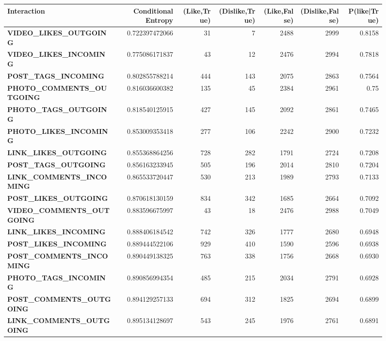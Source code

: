 \documentclass[letterpaper]{article}
\begin{document}
\begin{figure}
\begin{table}
	\centering
	\begin{tabular}{| >{\small}l | >{\small}r | >{\small}r | >{\small}r | >{\small}r | >{\small}r | >{\small}r |}
	\hline
	Interaction & Conditional Entropy & (Like,True) & (Dislike,True) & (Like,False) & (Dislike,False)  & P(like|True)\\
	\hline
	\textbf{VIDEO\_LIKES\_OUTGOING} & 0.722397472066 & 31 & 7 & 2488 & 2999 & 0.8158\\
	\hline
	\textbf{VIDEO\_LIKES\_INCOMING} & 0.775086171837 & 43 & 12 & 2476 & 2994 & 0.7818\\
	\hline
	\textbf{POST\_TAGS\_INCOMING} & 0.802855788214 & 444 & 143 & 2075 & 2863 & 0.7564\\
	\hline
	\textbf{PHOTO\_COMMENTS\_OUTGOING} & 0.816036600382 & 135 & 45 & 2384 & 2961 & 0.75\\
	\hline
	\textbf{PHOTO\_TAGS\_OUTGOING} & 0.818540125915 & 427 & 145 & 2092 & 2861 & 0.7465\\
	\hline
	\textbf{PHOTO\_LIKES\_INCOMING} & 0.853009353418 & 277 & 106 & 2242 & 2900 & 0.7232\\
	\hline
	\textbf{LINK\_LIKES\_OUTGOING} & 0.855368864256 & 728 & 282 & 1791 & 2724 & 0.7208\\
	\hline
	\textbf{POST\_TAGS\_OUTGOING} & 0.856163233945 & 505 & 196 & 2014 & 2810 & 0.7204\\
	\hline
	\textbf{LINK\_COMMENTS\_INCOMING} & 0.865533720447 & 530 & 213 & 1989 & 2793 & 0.7133 \\
	\hline
	\textbf{POST\_LIKES\_OUTGOING} & 0.870618130159 & 834 & 342 & 1685 & 2664 & 0.7092\\
	\hline
	\textbf{VIDEO\_COMMENTS\_OUTGOING} & 0.883596675997 & 43 & 18 & 2476 & 2988 & 0.7049\\
	\hline
	\textbf{LINK\_LIKES\_INCOMING} & 0.888406184542 & 742 & 326 & 1777 & 2680 & 0.6948\\
	\hline
	\textbf{POST\_LIKES\_INCOMING} & 0.889444522106 & 929 & 410 & 1590 & 2596 & 0.6938\\
	\hline
	\textbf{POST\_COMMENTS\_INCOMING} & 0.890449138325 & 763 & 338 & 1756 & 2668 & 0.6930\\
	\hline
	\textbf{PHOTO\_TAGS\_INCOMING} & 0.890856994354 & 485 & 215 & 2034 & 2791 & 0.6928\\
	\hline
	\textbf{POST\_COMMENTS\_OUTGOING} & 0.894129257133 & 694 & 312 & 1825 & 2694 & 0.6899\\
	\hline
	\textbf{LINK\_COMMENTS\_OUTGOING} & 0.895134128697 & 543 & 245 & 1976 & 2761 & 0.6891\\

\end{tabular}
\end{table}
\end{figure}
\end{document}
